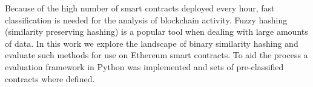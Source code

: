 \documentclass[../main.tex]{subfiles}
\begin{document}
Because of the high number of smart contracts deployed every hour, fast classification is needed for the analysis of blockchain activity.
Fuzzy hashing (similarity preserving hashing) is a popular tool when dealing with large amounts of data.
In this work we explore the landscape of binary similarity hashing and evaluate such methods for use on Ethereum smart contracts.
To aid the process a evaluation framework in Python was implemented and sets of pre-classified contracts where defined.
\end{document}
